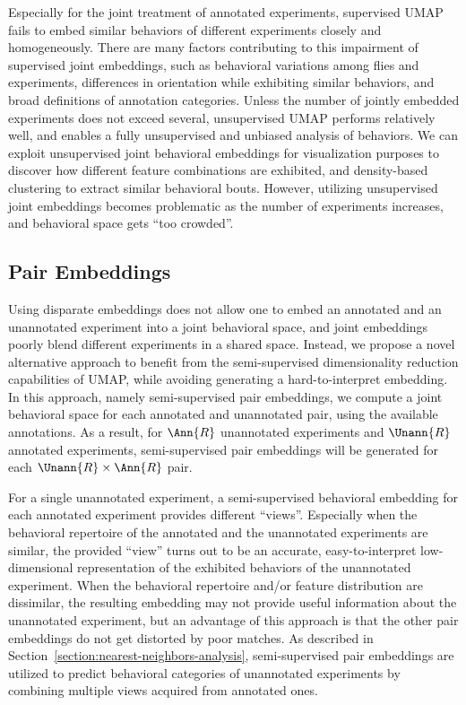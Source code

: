Especially for the joint treatment of annotated experiments, supervised UMAP fails to embed similar behaviors of different experiments closely and homogeneously.
There are many factors contributing to this impairment of supervised joint embeddings, such as behavioral variations among flies and experiments,  differences in orientation while exhibiting similar behaviors, and broad definitions of annotation categories.
Unless the number of jointly embedded experiments does not exceed several, unsupervised UMAP performs relatively well, and enables a fully unsupervised and unbiased analysis of behaviors.
We can exploit unsupervised joint behavioral embeddings for visualization purposes to discover how different feature combinations are exhibited, and density-based clustering to extract similar behavioral bouts.
However, utilizing unsupervised joint embeddings becomes problematic as the number of experiments increases, and behavioral space gets ``too crowded''.

\subsection{Pair Embeddings}\label{section:pair-embeddings}
Using disparate embeddings does not allow one to embed an annotated and an unannotated experiment into a joint behavioral space, and joint embeddings poorly blend different experiments in a shared space.
Instead, we propose a novel alternative approach to benefit from the semi-supervised dimensionality reduction capabilities of UMAP, while avoiding generating a hard-to-interpret embedding.
In this approach, namely semi-supervised pair embeddings, we compute a joint behavioral space for each annotated and unannotated pair, using the available annotations.
As a result, for $\Ann{R}$ unannotated experiments and  $\Unann{R}$ annotated experiments, semi-supervised pair embeddings will be generated for each $\Unann{R} \times \Ann{R}$ pair.

For a single unannotated experiment, a semi-supervised behavioral embedding for each annotated experiment provides different ``views''.
Especially when the behavioral repertoire of the annotated and the unannotated experiments are similar, the provided ``view'' turns out to be an accurate, easy-to-interpret low-dimensional representation of the exhibited behaviors of the unannotated experiment.
When the behavioral repertoire and/or feature distribution are dissimilar, the resulting embedding may not provide useful information about the unannotated experiment, but an advantage of this approach is that the other pair embeddings do not get distorted by poor matches.
As described in Section~\ref{section:nearest-neighbors-analysis}, semi-supervised pair embeddings are utilized to predict behavioral categories of unannotated experiments by combining multiple views acquired from annotated ones.

